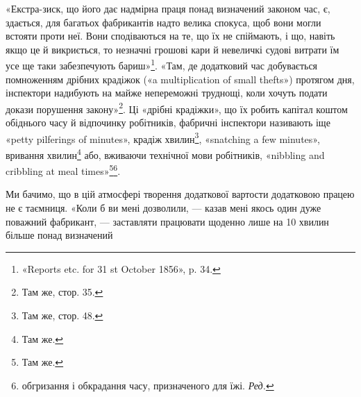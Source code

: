 «Екстра-зиск, що його дає надмірна праця понад визначений
законом час, є, здається, для багатьох фабрикантів надто
велика спокуса, щоб вони могли встояти проти неї. Вони сподіваються
на те, що їх не спіймають, і що, навіть якщо це й
викриється, то незначні грошові кари й невеличкі судові витрати
їм усе ще таки забезпечують бариш»\footnote{
«Reports etc. for 31 st October 1856», p. 34.
}. «Там, де додатковий
час добувається помноженням дрібних крадіжок («a multiplication
of small thefts») протягом дня, інспектори надибують на
майже непереможні труднощі, коли хочуть подати докази порушення
закону»\footnote{
Там же, стор. 35.
}. Ці «дрібні крадіжки», що їх робить капітал
коштом обіднього часу й відпочинку робітників, фабричні інспектори
називають іще «petty pilferings of minutes», крадіж хвилин\footnote{
Там же, стор. 48.
},
«snatching a few minutes», вривання хвилин\footnote{
Там же.
} або, вживаючи технічної
мови робітників, «nibbling and cribbling at meal times»\footnote{
Там же.
}\footnote*{
обгризання і обкрадання часу, призначеного для їжі. \emph{Ред.}
}.

Ми бачимо, що в цій атмосфері творення додаткової вартости
додатковою працею не є таємниця. «Коли б ви мені дозволили, —
казав мені якось один дуже поважний фабрикант, — заставляти
працювати щоденно лише на 10 хвилин більше понад визначений
\parbreak{}  %
